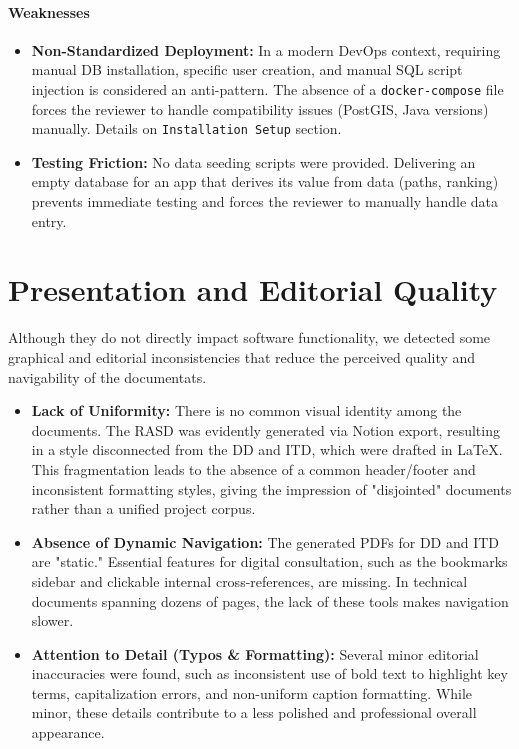 \paragraph{Weaknesses}
\begin{itemize}
    \item \textbf{Non-Standardized Deployment:} In a modern DevOps context, requiring manual DB installation, specific user creation, and manual SQL script injection is considered an anti-pattern. The absence of a \texttt{docker-compose} file forces the reviewer to handle compatibility issues (PostGIS, Java versions) manually. Details on \texttt{Installation Setup} section.
    \item \textbf{Testing Friction:} No data seeding scripts were provided. Delivering an empty database for an app that derives its value from data (paths, ranking) prevents immediate testing and forces the reviewer to manually handle data entry.
\end{itemize}

\section{Presentation and Editorial Quality}
Although they do not directly impact software functionality, we detected some graphical and editorial inconsistencies that reduce the perceived quality and navigability of the documentats.

\begin{itemize}
    \item \textbf{Lack of Uniformity:} There is no common visual identity among the documents. The RASD was evidently generated via Notion export, resulting in a style disconnected from the DD and ITD, which were drafted in LaTeX. This fragmentation leads to the absence of a common header/footer and inconsistent formatting styles, giving the impression of "disjointed" documents rather than a unified project corpus.
    
    \item \textbf{Absence of Dynamic Navigation:} The generated PDFs for DD and ITD are "static." Essential features for digital consultation, such as the bookmarks sidebar and clickable internal cross-references, are missing. In technical documents spanning dozens of pages, the lack of these tools makes navigation slower.
    
    \item \textbf{Attention to Detail (Typos \& Formatting):} Several minor editorial inaccuracies were found, such as inconsistent use of bold text to highlight key terms, capitalization errors, and non-uniform caption formatting. While minor, these details contribute to a less polished and professional overall appearance.
\end{itemize}